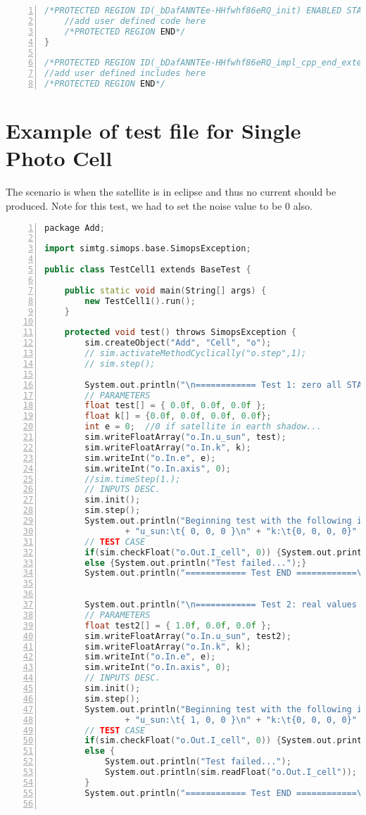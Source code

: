 \begin{appendices}
\begin{lstlisting}[frame=single,
numbers=left, basicstyle=\tiny, language = C++]
	/*PROTECTED REGION ID(_bDafANNTEe-HHfwhf86eRQ_init) ENABLED START*/
	//add user defined code here
	/*PROTECTED REGION END*/
}

/*PROTECTED REGION ID(_bDafANNTEe-HHfwhf86eRQ_impl_cpp_end_extensionsimplementation) ENABLED START*/
//add user defined includes here
/*PROTECTED REGION END*/

\end{lstlisting}


\newpage
\section{Example of test file for Single Photo Cell}
\label{sec:test_example}
The scenario is when the satellite is in eclipse and thus no current should be produced. Note for this test, we had to set the noise value to be 0 also.

\begin{lstlisting}[frame=single,
numbers=left, basicstyle=\tiny, language = C++]
    package Add;

import simtg.simops.base.SimopsException;

public class TestCell1 extends BaseTest {

	public static void main(String[] args) {
		new TestCell1().run();
	}

	protected void test() throws SimopsException {
		sim.createObject("Add", "Cell", "o");
		// sim.activateMethodCyclically("o.step",1);
		// sim.step();
		
		System.out.println("\n============ Test 1: zero all START ============");
		// PARAMETERS
		float test[] = { 0.0f, 0.0f, 0.0f };
		float k[] = {0.0f, 0.0f, 0.0f, 0.0f};
		int e = 0;	//0 if satellite in earth shadow...
		sim.writeFloatArray("o.In.u_sun", test);
		sim.writeFloatArray("o.In.k", k);
		sim.writeInt("o.In.e", e);
		sim.writeInt("o.In.axis", 0);
		//sim.timeStep(1.);
		// INPUTS DESC.
		sim.init();
		sim.step();
		System.out.println("Beginning test with the following inputs: \n" 
				+ "u_sun:\t{ 0, 0, 0 }\n" + "k:\t{0, 0, 0, 0}" + "\n" + "e:\t" + e);
		// TEST CASE
		if(sim.checkFloat("o.Out.I_cell", 0)) {System.out.println("Success!");} 
		else {System.out.println("Test failed...");}
		System.out.println("============ Test END ============\n");
		
		
		System.out.println("\n============ Test 2: real values for u, k and e = 0 START ============");
		// PARAMETERS
		float test2[] = { 1.0f, 0.0f, 0.0f };
		sim.writeFloatArray("o.In.u_sun", test2);
		sim.writeFloatArray("o.In.k", k);
		sim.writeInt("o.In.e", e);
		sim.writeInt("o.In.axis", 0);
		// INPUTS DESC.
		sim.init();
		sim.step();
		System.out.println("Beginning test with the following inputs: \n" 
				+ "u_sun:\t{ 1, 0, 0 }\n" + "k:\t{0, 0, 0, 0}" + "\n" + "e:\t" + e);
		// TEST CASE
		if(sim.checkFloat("o.Out.I_cell", 0)) {System.out.println("Success!");} 
		else {
			System.out.println("Test failed...");
			System.out.println(sim.readFloat("o.Out.I_cell"));
		}
		System.out.println("============ Test END ============\n");


\end{lstlisting}
\end{appendices}
